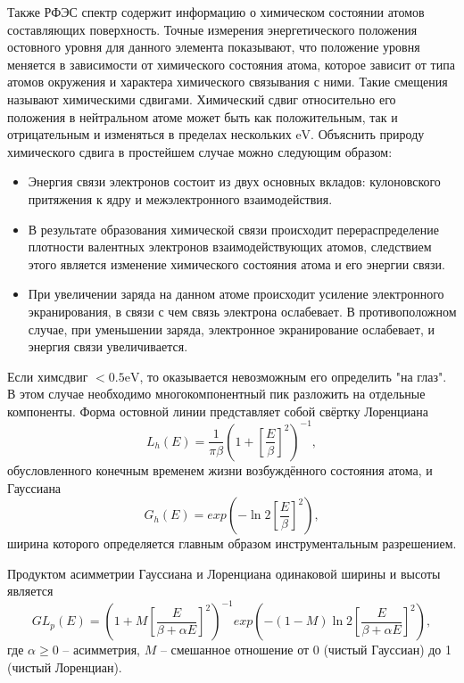 Также РФЭС спектр содержит информацию о химическом состоянии атомов
составляющих поверхность. Точные измерения энергетического положения 
остовного уровня для данного элемента показывают, что положение уровня 
меняется в зависимости от химического состояния атома, которое зависит 
от типа атомов окружения и характера химического связывания с ними.
Такие смещения называют химическими сдвигами.
Химический сдвиг относительно его положения в нейтральном атоме может 
быть как положительным, так и отрицательным и изменяться в пределах
нескольких $\si{\eV}$. Объяснить природу химического сдвига 
в простейшем случае можно следующим образом:
	\vspace{15pt}
		\begin{itemize}
			\item Энергия связи электронов состоит из двух основных вкладов: 
			кулоновского притяжения к ядру и межэлектронного взаимодействия.
			\item В результате образования химической связи происходит 
			перераспределение плотности валентных электронов взаимодействующих
			атомов, следствием этого является изменение химического состояния
			атома и его энергии связи.
			\item При увеличении заряда на данном атоме происходит усиление
			электронного экранирования, в связи с чем связь электрона ослабевает.
			В противоположном случае, при уменьшении заряда, электронное
			экранирование ослабевает, и энергия связи увеличивается.
		\end{itemize}
	\vspace{15pt}
Если химсдвиг $<0.5\si{\eV}$, то оказывается невозможным
его определить "на глаз". В этом случае необходимо многокомпонентный
пик разложить на отдельные компоненты. Форма остовной линии 
представляет собой свёртку Лоренциана
	\begin{equation} 
		\label{equation: Lorenc}
		L_h(E)=\frac{1}{\pi \beta}\left(1+\left[\frac{E}{\beta}\right]^2\right)^{-1},
	\end{equation}
обусловленного конечным временем жизни возбуждённого состояния атома, 
и Гауссиана
	\begin{equation}
		G_h(E)=exp\left(-\ln{2\left[\frac{E}{\beta}\right]^2}\right),
	\end{equation}
ширина которого определяется главным образом инструментальным 
разрешением. 


Продуктом асимметрии Гауссиана и Лоренциана одинаковой ширины
и высоты является
	\begin{equation}
		GL_p(E)=\left(1+M\left[\frac{E}{\beta+\alpha E}\right]^2\right)^{-1}
		exp\left(-(1-M)\ln{2\left[\frac{E}{\beta+\alpha E}\right]^2}\right),
	\end{equation}
где $\alpha\geq0$ -- асимметрия, $M$ -- смешанное отношение от 0 
(чистый Гауссиан) до 1 (чистый Лоренциан).


